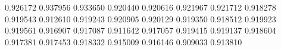 0.926172
0.937956
0.933650
0.920440
0.920616
0.921967
0.921712
0.918278
0.919543
0.912610
0.919243
0.920905
0.920129
0.919350
0.918512
0.919923
0.919561
0.916907
0.917087
0.911642
0.917057
0.919415
0.919137
0.918604
0.917381
0.917453
0.918332
0.915009
0.916146
0.909033
0.913810
